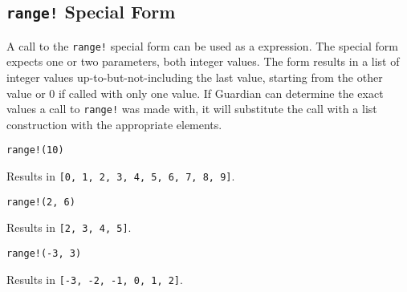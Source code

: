 
\subsection{\texttt{range!} Special Form}
{
	A call to the \texttt{range!} special form can be used as a expression.
	The special form expects one or two parameters, both integer values.
	The form results in a list of integer values up-to-but-not-including
	the last value, starting from the other value or 0 if called with only
	one value.
	If Guardian can determine the exact values a call to \texttt{range!}
	was made with, it will substitute the call with a list construction
	with the appropriate elements.
	
	\begin{itemize}
	{
		\item \texttt{range!(10)}
		
			Results in \texttt{[0, 1, 2, 3, 4, 5, 6, 7, 8, 9]}.
		
		\item \texttt{range!(2, 6)}
		
			Results in \texttt{[2, 3, 4, 5]}.
			
		\item \texttt{range!(-3, 3)}
		
			Results in \texttt{[-3, -2, -1, 0, 1, 2]}.
	}
	\end{itemize}
}
